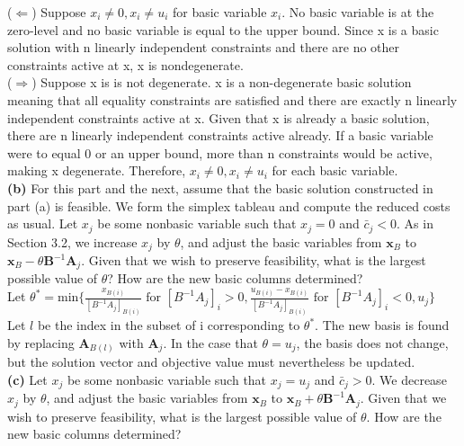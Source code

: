 \documentclass{article}
\begin{document}
\noindent
($\Leftarrow$) Suppose $x_i \neq 0, x_i \neq u_i$ for basic variable $x_i$.  No basic variable is at the zero-level and no basic variable is equal to the upper bound.  Since x is a basic solution with n linearly independent constraints and there are no other constraints active at x, x is nondegenerate.\\

\noindent
($\Rightarrow$)
Suppose x is is not degenerate.  x is a non-degenerate basic solution meaning that all equality constraints are satisfied and there are exactly n linearly independent constraints active at x.  Given that x is already a basic solution, there are n linearly independent constraints active already.  If a basic variable were to equal 0 or an upper bound, more than n constraints would be active, making x degenerate.  Therefore, $x_i \neq 0, x_i \neq u_i$ for each basic variable.\\


\noindent
\textbf{(b)}  For this part and the next, assume that the basic solution constructed in part (a) is feasible.  We form the simplex tableau and compute the reduced costs as usual.  Let $x_j$ be some nonbasic variable such that $x_j = 0$ and $\bar{c}_j < 0$.  As in Section 3.2, we increase $x_j$ by $\theta$, and adjust the basic variables from $\mathbf{x}_B$ to $\mathbf{x}_B - \theta \mathbf{B}^{-1}\mathbf{A}_j$.  Given that we wish to preserve feasibility, what is the largest possible value of $\theta$?  How are the new basic columns determined?\\

\noindent
Let $\theta^* = \text{min} \{\frac{x_{B(i)}}{[B^{-1}A_j]_{B(i)}} \text{ for } [B^{-1}A_j]_i > 0, \frac{u_{B(i)} - x_{B(i)}}{[B^{-1}A_j]_{B(i)}} \text{ for } [B^{-1}A_j]_i < 0,u_j \}$ \\
Let $l$ be the index in the subset of i corresponding to $\theta^*$.  The new basis is found by replacing $\mathbf{A}_{B(l)}$ with $\mathbf{A}_j$.  In the case that $\theta = u_j$, the basis does not change, but the solution vector and objective value must nevertheless be updated.\\



\noindent
\textbf{(c)} Let $x_j$ be some nonbasic variable such that $x_j = u_j$ and $\bar{c}_j > 0$.  We decrease $x_j$ by $\theta$, and adjust the basic variables from $\mathbf{x}_B$ to $\mathbf{x}_B + \theta \mathbf{B}^{-1}\mathbf{A}_j$.  Given that we wish to preserve feasibility, what is the largest possible value of $\theta$.  How are the new basic columns determined? \\
\end{document}
